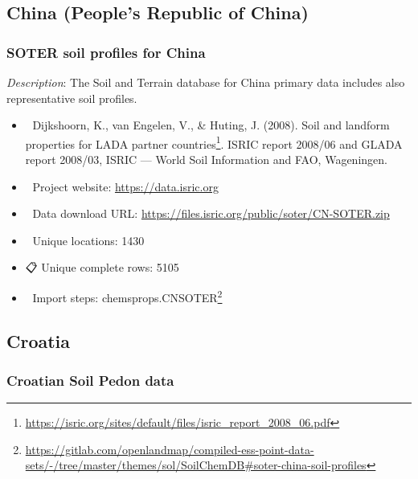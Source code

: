 \documentclass[
  graybox,natbib,nospthms]{svmono}
\providecommand{\tightlist}{%
  \setlength{\itemsep}{0pt}\setlength{\parskip}{0pt}}
\providecommand{\tightlist}{\setlength{\itemsep}{0pt}\setlength{\parskip}{0pt}}
\renewcommand{\href}[2]{#2 (\url{#1})}
\renewcommand{\href}[2]{#2\footnote{\url{#1}}}
\begin{document}
\hypertarget{china-peoples-republic-of-china}{%
\subsection{China (People's Republic of China)}\label{china-peoples-republic-of-china}}

\hypertarget{soter-soil-profiles-for-china}{%
\subsubsection{SOTER soil profiles for China}\label{soter-soil-profiles-for-china}}

\emph{Description}: The Soil and Terrain database for China primary data includes also
representative soil profiles.

\begin{itemize}
\tightlist
\item
  📕 Dijkshoorn, K., van Engelen, V., \& Huting, J. (2008). \href{https://isric.org/sites/default/files/isric_report_2008_06.pdf}{Soil and landform properties for LADA partner countries}. ISRIC report 2008/06 and GLADA report 2008/03, ISRIC --- World Soil Information and FAO, Wageningen.\\
\item
  🔗 Project website: \url{https://data.isric.org}\\
\item
  📂 Data download URL: \url{https://files.isric.org/public/soter/CN-SOTER.zip}\\
\item
  📍 Unique locations: 1430\\
\item
  📋 Unique complete rows: 5105\\
\item
  📝 Import steps: \href{https://gitlab.com/openlandmap/compiled-ess-point-data-sets/-/tree/master/themes/sol/SoilChemDB\#soter-china-soil-profiles}{chemsprops.CNSOTER}
\end{itemize}

\hypertarget{croatia}{%
\subsection{Croatia}\label{croatia}}

\hypertarget{croatian-soil-pedon-data}{%
\subsubsection{Croatian Soil Pedon data}\label{croatian-soil-pedon-data}}
\end{document}
